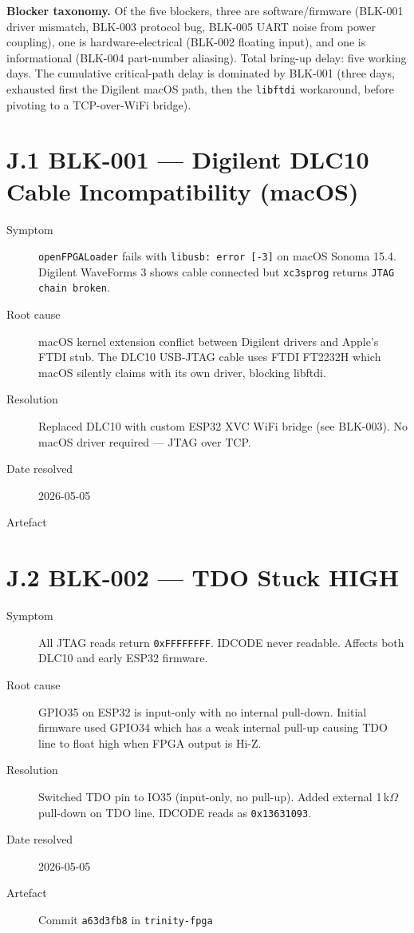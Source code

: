 \textbf{Blocker taxonomy.} Of the five blockers, three are software/firmware
(BLK-001 driver mismatch, BLK-003 protocol bug, BLK-005 UART noise from
power coupling), one is hardware-electrical (BLK-002 floating input), and
one is informational (BLK-004 part-number aliasing). Total bring-up delay:
five working days. The cumulative critical-path delay is dominated by
BLK-001 (three days, exhausted first the Digilent macOS path, then the
\texttt{libftdi} workaround, before pivoting to a TCP-over-WiFi bridge).

\section*{J.1 BLK-001 --- Digilent DLC10 Cable Incompatibility (macOS)}
\label{sec:appJ-blk001}

\begin{description}
  \item[Symptom] \texttt{openFPGALoader} fails with \texttt{libusb: error [-3]}
    on macOS Sonoma 15.4. Digilent WaveForms 3 shows cable connected but
    \texttt{xc3sprog} returns \texttt{JTAG chain broken}.
  \item[Root cause] macOS kernel extension conflict between Digilent drivers
    and Apple's FTDI stub. The DLC10 USB-JTAG cable uses FTDI FT2232H which
    macOS silently claims with its own driver, blocking libftdi.
  \item[Resolution] Replaced DLC10 with custom ESP32 XVC WiFi bridge
    (see BLK-003). No macOS driver required --- JTAG over TCP.
  \item[Date resolved] 2026-05-05
  \item[Artefact] 
\end{description}

\section*{J.2 BLK-002 --- TDO Stuck HIGH}
\label{sec:appJ-blk002}

\begin{description}
  \item[Symptom] All JTAG reads return \texttt{0xFFFFFFFF}. IDCODE never
    readable. Affects both DLC10 and early ESP32 firmware.
  \item[Root cause] GPIO35 on ESP32 is input-only with no internal pull-down.
    Initial firmware used GPIO34 which has a weak internal pull-up causing TDO
    line to float high when FPGA output is Hi-Z.
  \item[Resolution] Switched TDO pin to IO35 (input-only, no pull-up).
    Added external 1\,k$\Omega$ pull-down on TDO line. IDCODE reads as
    \texttt{0x13631093}.
  \item[Date resolved] 2026-05-05
  \item[Artefact] Commit \texttt{a63d3fb8} in \texttt{trinity-fpga}
\end{description}

